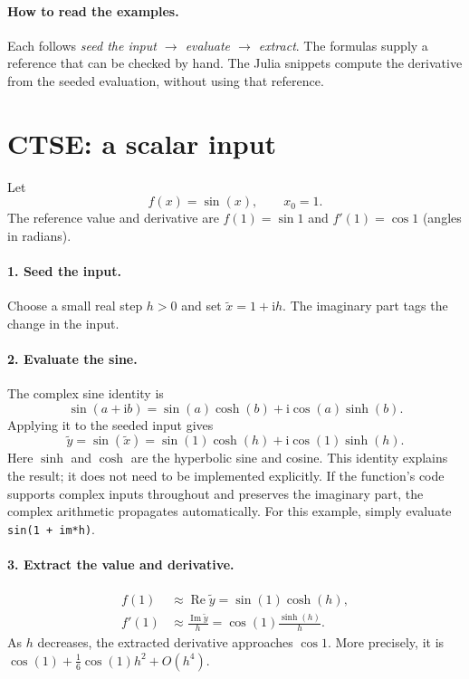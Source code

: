\documentclass[11pt]{article}
\newcommand{\ii}{\mathrm i}
\begin{document}
\paragraph{How to read the examples.}
Each follows \emph{seed the input $\rightarrow$ evaluate $\rightarrow$ extract}.
The formulas supply a reference that can be checked by hand. The Julia snippets
compute the derivative from the seeded evaluation, without using that reference.

\section{CTSE: a scalar input}\label{sec:ctse-scalar}
Let
\[
 f(x)=\sin(x),\qquad x_0=1.
\]
The reference value and derivative are
$f(1)=\sin 1$ and $f'(1)=\cos 1$ (angles in radians).

\paragraph{1. Seed the input.}
Choose a small real step $h>0$ and set $\widetilde x=1+\ii h$.
The imaginary part tags the change in the input.

\paragraph{2. Evaluate the sine.}
The complex sine identity is
\[
 \sin(a+\ii b)=\sin(a)\cosh(b)+\ii\cos(a)\sinh(b).
\]
Applying it to the seeded input gives
\[
 \widetilde y=\sin(\widetilde x)
   =\sin(1)\cosh(h)+\ii\cos(1)\sinh(h).
\]
Here $\sinh$ and $\cosh$ are the hyperbolic sine and cosine.
This identity explains the result; it does not need to be implemented
explicitly. If the function's code supports complex inputs throughout and
preserves the imaginary part, the complex arithmetic propagates automatically.
For this example, simply evaluate \texttt{sin(1 + im*h)}.

\paragraph{3. Extract the value and derivative.}
\[
 \boxed{\begin{aligned}
 f(1)&\approx\operatorname{Re}\widetilde y
       =\sin(1)\cosh(h),\\
 f'(1)&\approx\frac{\operatorname{Im}\widetilde y}{h}
       =\cos(1)\frac{\sinh(h)}{h}.
 \end{aligned}}
\]
As $h$ decreases, the extracted derivative approaches $\cos 1$. More precisely,
it is $\cos(1)+\tfrac16\cos(1)h^2+O(h^4)$.
\end{document}
